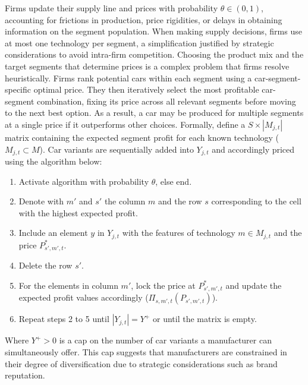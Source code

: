\documentclass[12pt]{article}
\begin{document}
	Firms update their supply line and prices with probability $\theta\in(0,1)$, accounting for frictions in production, price rigidities, or delays in obtaining information on the segment population. When making supply decisions, firms use at most one technology per segment, a simplification justified by strategic considerations to avoid intra-firm competition. Choosing the product mix and the target segments that determine prices is a complex problem that firms resolve heuristically. Firms rank potential cars within each segment using a car-segment-specific optimal price. They then iteratively select the most profitable car-segment combination, fixing its price across all relevant segments before moving to the next best option. As a result, a car may be produced for multiple segments at a single price if it outperforms other choices. Formally, define a ${S}\times{|M_{j,t}|}$ matrix containing the expected segment profit for each known technology ($M_{j,t}\subset M$). Car variants are sequentially added into $Y_{j,t}$ and accordingly priced using the algorithm below: 
	\begin{enumerate}
		\item Activate algorithm with probability $\theta$, else end.
		\item Denote with $m'$ and $s'$ the column $m$ and the row $s$ corresponding to the cell with the highest expected profit.
		\item Include an element $y$ in $Y_{j,t}$ with the features of technology $m\in{M_{j,t}}$ and the price $P^*_{s',m',t}$.
		\item Delete the row $s'$.
		\item For the elements in column $m'$, lock the price at $P^*_{s',m',t}$ and update the expected profit values accordingly ($\Pi_{s,m',t}(P_{s',m',t})$).
		\item Repeat steps 2 to 5 until $|Y_{j,t}|=Y^+$ or until the matrix is empty.
	\end{enumerate}
	
	Where $Y^+>0$ is a cap on the number of car variants a manufacturer can simultaneously offer. This cap suggests that manufacturers are constrained in their degree of diversification due to strategic considerations such as brand reputation. 
	
\end{document}
